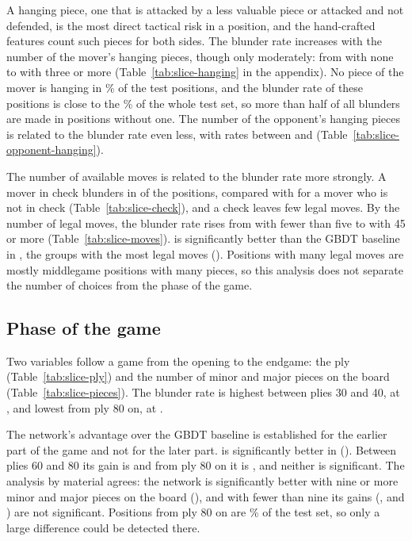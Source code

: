 \documentclass[11pt]{article}
\begin{document}
A hanging piece, one that is attacked by a less valuable piece or attacked
and not defended, is the most direct tactical risk in a position, and the
hand-crafted features count such pieces for both sides. The blunder rate
increases with the number of the mover's hanging pieces, though only
moderately: from  with none to
 with three or more
(Table~\ref{tab:slice-hanging} in the appendix). No piece of the mover is
hanging in \% of the test positions, and the blunder
rate of these positions is close to the \% of the whole
test set, so more than half of all blunders are made in positions without
one. The number of the opponent's hanging pieces is related to the blunder
rate even less, with rates between  and
(Table~\ref{tab:slice-opponent-hanging}).

The number of available moves is related to the blunder rate more strongly.
A mover in check blunders in  of the positions,
compared with  for a mover who is not in check
(Table~\ref{tab:slice-check}), and a check leaves few legal moves. By the
number of legal moves, the blunder rate rises from
 with fewer than five to
 with 45 or more
(Table~\ref{tab:slice-moves}).  is significantly better
than the GBDT baseline in , the groups with the most
legal moves (). Positions with many legal moves
are mostly middlegame positions with many pieces, so this analysis does not
separate the number of choices from the phase of the game.

\subsection{Phase of the game}

Two variables follow a game from the opening to the endgame: the ply
(Table~\ref{tab:slice-ply}) and the number of minor and major pieces on the
board (Table~\ref{tab:slice-pieces}). The blunder rate is highest between
plies 30 and 40, at , and lowest from ply 80 on,
at .

The network's advantage over the GBDT baseline is established for the
earlier part of the game and not for the later part.  is
significantly better in 
(). Between plies 60 and 80 its gain is
 and from ply 80 on it is ,
and neither is significant. The analysis by material agrees: the network is
significantly better with nine or more minor and major pieces on the board
(), and with fewer than nine its gains
(,  and
) are not significant. Positions from ply 80 on are
\% of the test set, so only a large difference could
be detected there.
\end{document}
